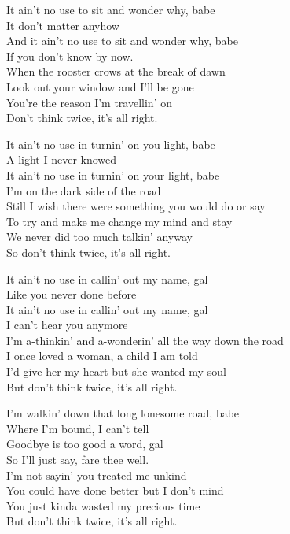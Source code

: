 
\ve{}
It ain't no use to sit and wonder why, babe\\
It don't matter anyhow \\
And it ain't no use to sit and wonder why, babe\\
If you don't know by now. \\
When the rooster crows at the break of dawn\\
Look out your window and I'll be gone\\
You're the reason I'm travellin' on\\
Don't think twice, it's all right. 

\ve{}
It ain't no use in turnin' on you light, babe\\
A light I never knowed\\
It ain't no use in turnin' on your light, babe\\
I'm on the dark side of the road\\
Still I wish there were something you would do or say\\
To try and make me change my mind and stay\\
We never did too much talkin' anyway\\
So don't think twice, it's all right.

\ve{}
It ain't no use in callin' out my name, gal\\
Like you never done before\\
It ain't no use in callin' out my name, gal\\
I can't hear you anymore\\
I'm a-thinkin' and a-wonderin' all the way down the road\\
I once loved a woman, a child I am told\\
I'd give her my heart but she wanted my soul\\
But don't think twice, it's all right.

\ve{}
I'm walkin' down that long lonesome road, babe\\
Where I'm bound, I can't tell\\
Goodbye is too good a word, gal\\
So I'll just say, fare thee well.\\
I'm not sayin' you treated me unkind\\
You could have done better but I don't mind\\
You just kinda wasted my precious time\\
But don't think twice, it's all right.

\esong
